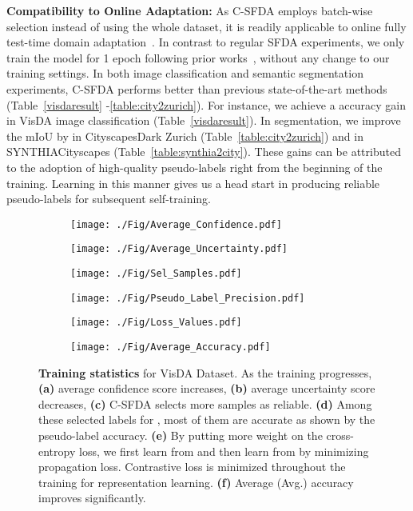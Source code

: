 \documentclass[10pt,twocolumn,letterpaper]{article}
\begin{document}
\vspace{0.6mm}
\noindent \textbf{Compatibility to Online Adaptation:} As C-SFDA employs batch-wise selection instead of using the whole dataset, it is readily applicable to online fully test-time domain adaptation~\cite{wang2021tent,prabhu2022augmentation}. In contrast to regular SFDA experiments, we only train the model for 1 epoch following prior works~\cite{wang2021tent, prabhu2022augmentation}, without any change to our training settings. In both image classification and semantic segmentation experiments, C-SFDA performs better than previous state-of-the-art methods (Table~\ref{visdaresult} -\ref{table:city2zurich}). For instance, we achieve a  accuracy gain in VisDA image classification (Table~\ref{visdaresult}). In segmentation, we improve the mIoU by  in CityscapesDark Zurich (Table~\ref{table:city2zurich}) and  in  SYNTHIACityscapes (Table~\ref{table:synthia2city}). These gains can be attributed to the adoption of high-quality pseudo-labels right from the beginning of the training. Learning in this manner gives us a head start in producing reliable pseudo-labels for subsequent self-training.
\begin{figure}[htb]
  \centering
  \begin{subfigure}{0.48\linewidth}
    \texttt{[image: ./Fig/Average\_Confidence.pdf]}
\end{subfigure}
\begin{subfigure}{0.48\linewidth}
    \texttt{[image: ./Fig/Average\_Uncertainty.pdf]}
\end{subfigure}
  \begin{subfigure}{0.48\linewidth}
    \texttt{[image: ./Fig/Sel\_Samples.pdf]}
\end{subfigure}
\begin{subfigure}{0.48\linewidth}
    \texttt{[image: ./Fig/Pseudo\_Label\_Precision.pdf]}
\end{subfigure}
  \begin{subfigure}{0.48\linewidth}
    \texttt{[image: ./Fig/Loss\_Values.pdf]}
\end{subfigure}
\begin{subfigure}{0.48\linewidth}
    \texttt{[image: ./Fig/Average\_Accuracy.pdf]}
\end{subfigure}
  \vspace{-1.5mm}
  \caption{\footnotesize \textbf{Training statistics} for {VisDA Dataset}. As the training progresses, \textbf{(a)} average confidence score increases, \textbf{(b)} average uncertainty score decreases, \textbf{(c)} C-SFDA selects more samples as reliable. \textbf{(d)} Among these selected labels for , most of them are accurate as shown by the pseudo-label accuracy. \textbf{(e)} By putting more weight on the cross-entropy loss, we first learn from  and then learn from  by minimizing propagation loss. Contrastive loss is minimized throughout the training for representation learning.  \textbf{(f)} Average (Avg.) accuracy improves significantly.} 
\vspace{-2mm}
  \label{fig:sup:train_stats}
\end{figure}
\end{document}
